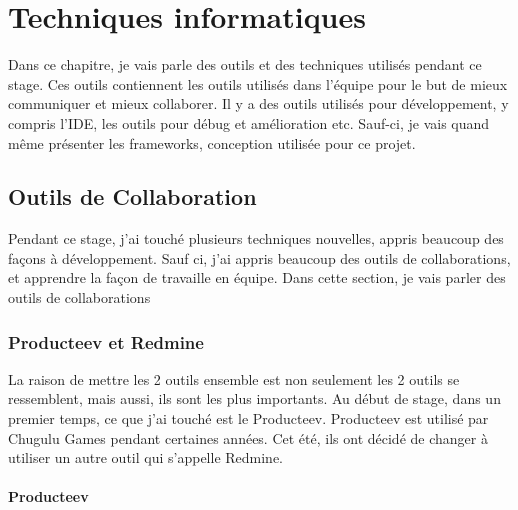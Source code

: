 \chapter{Techniques informatiques} %
\label{cha:techniques_informatiques}

Dans ce chapitre, je vais parle des outils et des techniques utilisés pendant ce stage. Ces outils contiennent les outils utilisés dans l'équipe pour le but de mieux communiquer et mieux collaborer. Il y a des outils utilisés pour développement, y compris l'IDE, les outils pour débug et amélioration etc. Sauf-ci, je vais quand même présenter les frameworks, conception utilisée pour ce projet.

\section{Outils de Collaboration} %
\label{sec:outils_de_collaboration}

Pendant ce stage, j'ai touché plusieurs techniques nouvelles, appris beaucoup des façons à développement. Sauf ci, j'ai appris beaucoup des outils de collaborations, et apprendre la façon de travaille en équipe. Dans cette section, je vais parler des outils de collaborations

\subsection{Producteev et Redmine} %
\label{ssub:producteev_et_redmine}

La raison de mettre les 2 outils ensemble est non seulement les 2 outils se ressemblent, mais aussi, ils sont les plus importants. Au début de stage, dans un premier temps, ce que j'ai touché est le Producteev. Producteev est utilisé par Chugulu Games pendant certaines années. Cet été, ils ont décidé de changer à utiliser un autre outil qui s'appelle Redmine. 

\subsubsection{Producteev} %
\label{ssub:producteev}


